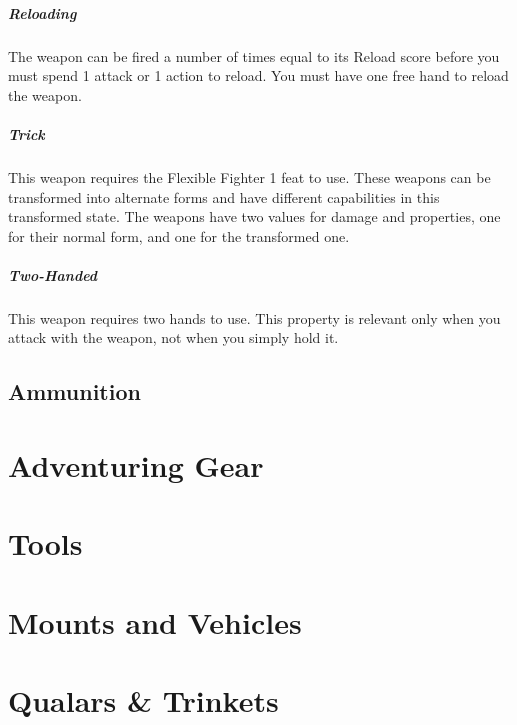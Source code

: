 \subparagraph{Reloading} The weapon can be fired a number of times equal to its Reload score before you must spend 1 attack or 1 action to reload.
You must have one free hand to reload the weapon.

\subparagraph{Trick} This weapon requires the Flexible Fighter 1 feat to use.
These weapons can be transformed into alternate forms and have different capabilities in this transformed state.
The weapons have two values for damage and properties, one for their normal form, and one for the transformed one.

\subparagraph{Two-Handed} This weapon requires two hands to use.
This property is relevant only when you attack with the weapon, not when you simply hold it.

\subsection*{Ammunition} \label{ssec::ammunition}

\section{Adventuring Gear} \label{sec::adventuring}
\section{Tools} \label{sec::tools}
\section{Mounts and Vehicles} \label{sec::adventuring}
\section{Qualars \& Trinkets} \label{sec::trinkets}
